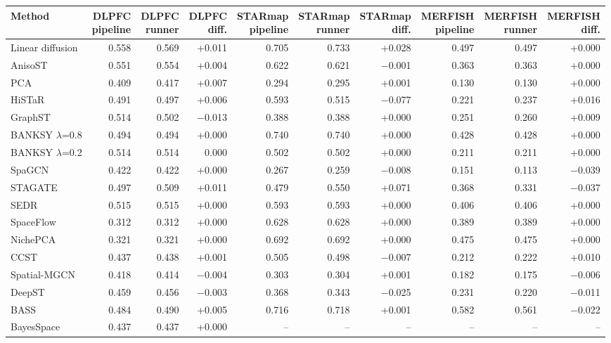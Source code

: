 \scriptsize
\begin{tabular}{lrrrrrrrrr}
\toprule
Method & \shortstack{DLPFC\\pipeline} & \shortstack{DLPFC\\runner} & \shortstack{DLPFC\\diff.} & \shortstack{STARmap\\pipeline} & \shortstack{STARmap\\runner} & \shortstack{STARmap\\diff.} & \shortstack{MERFISH\\pipeline} & \shortstack{MERFISH\\runner} & \shortstack{MERFISH\\diff.} \\
\midrule
Linear diffusion & 0.558 & 0.569 & +0.011 & 0.705 & 0.733 & +0.028 & 0.497 & 0.497 & +0.000 \\
AnisoST & 0.551 & 0.554 & +0.004 & 0.622 & 0.621 & $-$0.001 & 0.363 & 0.363 & +0.000 \\
PCA & 0.409 & 0.417 & +0.007 & 0.294 & 0.295 & +0.001 & 0.130 & 0.130 & +0.000 \\
HiSTaR & 0.491 & 0.497 & +0.006 & 0.593 & 0.515 & $-$0.077 & 0.221 & 0.237 & +0.016 \\
GraphST & 0.514 & 0.502 & $-$0.013 & 0.388 & 0.388 & +0.000 & 0.251 & 0.260 & +0.009 \\
BANKSY $\lambda$=0.8 & 0.494 & 0.494 & +0.000 & 0.740 & 0.740 & +0.000 & 0.428 & 0.428 & +0.000 \\
BANKSY $\lambda$=0.2 & 0.514 & 0.514 & 0.000 & 0.502 & 0.502 & +0.000 & 0.211 & 0.211 & +0.000 \\
SpaGCN & 0.422 & 0.422 & +0.000 & 0.267 & 0.259 & $-$0.008 & 0.151 & 0.113 & $-$0.039 \\
STAGATE & 0.497 & 0.509 & +0.011 & 0.479 & 0.550 & +0.071 & 0.368 & 0.331 & $-$0.037 \\
SEDR & 0.515 & 0.515 & +0.000 & 0.593 & 0.593 & +0.000 & 0.406 & 0.406 & +0.000 \\
SpaceFlow & 0.312 & 0.312 & +0.000 & 0.628 & 0.628 & +0.000 & 0.389 & 0.389 & +0.000 \\
NichePCA & 0.321 & 0.321 & +0.000 & 0.692 & 0.692 & +0.000 & 0.475 & 0.475 & +0.000 \\
CCST & 0.437 & 0.438 & +0.001 & 0.505 & 0.498 & $-$0.007 & 0.212 & 0.222 & +0.010 \\
Spatial-MGCN & 0.418 & 0.414 & $-$0.004 & 0.303 & 0.304 & +0.001 & 0.182 & 0.175 & $-$0.006 \\
DeepST & 0.459 & 0.456 & $-$0.003 & 0.368 & 0.343 & $-$0.025 & 0.231 & 0.220 & $-$0.011 \\
BASS & 0.484 & 0.490 & +0.005 & 0.716 & 0.718 & +0.001 & 0.582 & 0.561 & $-$0.022 \\
BayesSpace & 0.437 & 0.437 & +0.000 & -- & -- & -- & -- & -- & -- \\
\bottomrule
\end{tabular}
